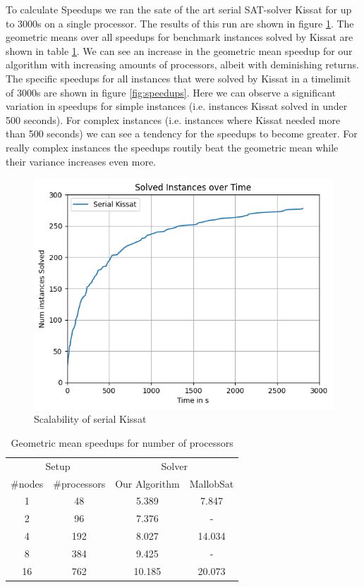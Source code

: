 \documentclass[12pt,a4paper,twoside]{scrartcl}
\numberwithin{equation}{section}
\begin{document}
To calculate Speedups we ran the sate of the art serial SAT-solver Kissat for up to 3000s on a single processor. The results of this run are shown in figure \ref{fig:runtimeSerial}. The geometric means over all speedups for benchmark instances solved by Kissat are shown in table \ref{tab:speedups}. We can see an increase in the geometric mean speedup for our algorithm with increasing amounts of processors, albeit with deminishing returns. The specific speedups for all instances that were solved by Kissat in a timelimit of 3000s are shown in figure \ref{fig:speedups}. Here we can observe a significant variation in speedups for simple instances (i.e. instances Kissat solved in under 500 seconds). For complex instances (i.e. instances where Kissat needed more than 500 seconds) we can see a tendency for the speedups to become greater. For really complex instances the speedups routily beat the geometric mean while their variance increases even more.

\begin{figure}
  \center
  \includegraphics{plots/cumulative_runtime/runtime_serial.png}
  \caption{Scalability of serial Kissat}
  \label{fig:runtimeSerial}
\end{figure}

\begin{table}
  \center
  \begin{tabular}{ cccc }
    \toprule
    \multicolumn{2}{c}{Setup} & \multicolumn{2}{c}{Solver}\\
    \#nodes   & \#processors   & Our Algorithm  & MallobSat \\
    \midrule
    1  & 48  & 5.389  & 7.847\\
    2  & 96  & 7.376   & -\\
    4  & 192 & 8.027   & 14.034\\
    8  & 384 & 9.425    & -\\
    16 & 762 & 10.185   & 20.073\\
    \bottomrule
  \end{tabular}
  \caption{Geometric mean speedups for number of processors}
  \label{tab:speedups}
\end{table}
\end{document}
